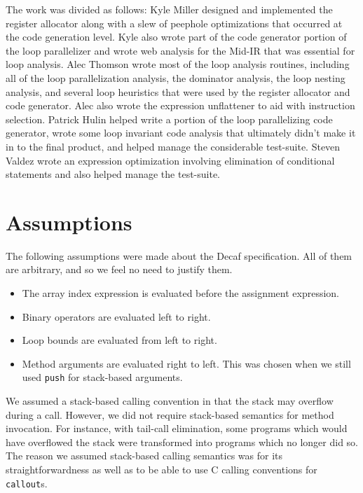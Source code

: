 \documentclass[11pt]{article}
\begin{document}
The work was divided as follows: Kyle Miller designed and implemented
the register allocator along with a slew of peephole optimizations
that occurred at the code generation level. Kyle also wrote part of
the code generator portion of the loop parallelizer and wrote web
analysis for the Mid-IR that was essential for loop analysis. Alec Thomson wrote most of
the loop analysis routines, including all of the loop parallelization
analysis, the dominator analysis, the loop nesting analysis, and
several loop heuristics that were used by the register allocator and
code generator. Alec
also wrote the expression unflattener to aid with instruction
selection. Patrick Hulin helped write a portion of the loop
parallelizing code generator, wrote some loop invariant code analysis
that ultimately didn't make it in to the final product, and helped
manage the considerable test-suite. Steven Valdez wrote an expression
optimization involving elimination of conditional statements and also
helped manage the test-suite. 

\section{Assumptions}

The following assumptions were made about the Decaf specification.
All of them are arbitrary, and so we feel no need to justify them.
\begin{itemize}
\item The array index expression is evaluated before the assignment
  expression.
\item Binary operators are evaluated left to right.
\item Loop bounds are evaluated from left to right.
\item Method arguments are evaluated right to left.  This was chosen
  when we still used \texttt{push} for stack-based arguments.
\end{itemize}

We assumed a stack-based calling convention in that the stack may
overflow during a call.  However, we did not require stack-based
semantics for method invocation.  For instance, with tail-call
elimination, some programs which would have overflowed the stack were
transformed into programs which no longer did so.  The reason we
assumed stack-based calling semantics was for its straightforwardness
as well as to be able to use C calling conventions for
\texttt{callout}s.
\end{document}
